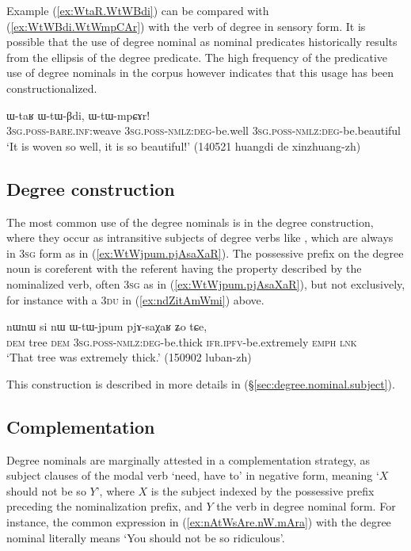 Example (\ref{ex:WtaR.WtWBdi}) can be compared with (\ref{ex:WtWBdi.WtWmpCAr}) with the verb of degree  in sensory form. It is possible that the use of degree nominal as nominal predicates historically results from the ellipsis of the degree predicate. The high frequency of the predicative use of degree nominals in the corpus however indicates that this usage has been constructionalized.

\begin{exe}
\ex \label{ex:WtWBdi.WtWmpCAr}
\gll ɯ-taʁ ɯ-tɯ-βdi, ɯ-tɯ-mpɕɤr! \\
\textsc{3sg}.\textsc{poss}-\textsc{bare}.\textsc{inf}:weave  \textsc{3sg}.\textsc{poss}-\textsc{nmlz}:\textsc{deg}-be.well \textsc{3sg}.\textsc{poss}-\textsc{nmlz}:\textsc{deg}-be.beautiful  \\
\glt `It is woven so well, it is so beautiful!' (140521 huangdi de xinzhuang-zh) 	
\end{exe}

\subsection{Degree construction} \label{sec:degree.nominal.construction}
The most common use of the degree nominals is in the degree construction, where they occur as intransitive subjects of degree verbs like , which are always in \textsc{3sg} form as in (\ref{ex:WtWjpum.pjAsaXaR}). The possessive prefix on the degree noun is coreferent with the referent having the property described by the nominalized verb, often \textsc{3sg} as in  (\ref{ex:WtWjpum.pjAsaXaR}), but not exclusively, for instance with a \textsc{3du} in (\ref{ex:ndZitAmWmi}) above.


\begin{exe}
\ex \label{ex:WtWjpum.pjAsaXaR}
\gll nɯnɯ si nɯ ɯ-tɯ-jpum pjɤ-saχaʁ ʑo tɕe,\\
\textsc{dem} tree \textsc{dem} \textsc{3sg}.\textsc{poss}-\textsc{nmlz}:\textsc{deg}-be.thick \textsc{ifr}.\textsc{ipfv}-be.extremely \textsc{emph} \textsc{lnk} \\
\glt `That tree was extremely thick.' (150902 luban-zh)
\end{exe}

This construction is described in more details in (§\ref{sec:degree.nominal.subject}).



\subsection{Complementation} \label{sec:degree.nominal.complement}
Degree nominals are marginally attested in a complementation strategy, as subject clauses of the modal verb  `need, have to' in negative form, meaning `$X$ should not be so $Y$', where $X$ is the subject indexed by the possessive prefix preceding the  nominalization prefix, and $Y$ the verb in degree nominal form. For instance, the common expression in (\ref{ex:nAtWsAre.nW.mAra}) with the degree nominal  literally means `You should not be so ridiculous'.  

